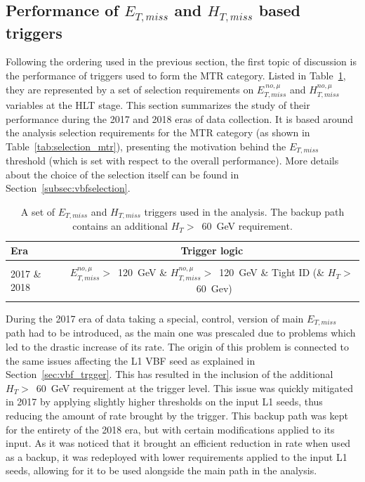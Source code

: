 \subsection{Performance of $E_{T,miss}$ and $H_{T,miss}$ based triggers}
\label{subsec:mtr_triggers}
\hspace{10pt} Following the ordering used in the previous section, the first topic of discussion is the performance of triggers used to form the MTR category. Listed in Table~\ref{tab:metmht}, they are represented by a set of selection requirements on $E_{T,miss}^{~no,\mu}$ and $H_{T,miss}^{no,\mu}$ variables at the HLT stage. This section summarizes the study of their performance during the 2017 and 2018 eras of data collection. It is based around the analysis selection requirements for the MTR category (as shown in Table~\ref{tab:selection_mtr}), presenting the motivation behind the $E_{T,miss}$ threshold (which is set with respect to the overall performance). More details about the choice of the selection itself can be found in Section~\ref{subsec:vbfselection}.

\begin{table}[htbp]
\centering
\small
\begin{tabular}{l|c}
\hline\hline
Era & Trigger logic                                               \\ \hline
\multirow{3}{*}{2017 \& 2018} &\\
                      &$E_{T,miss}^{no,\mu}>$~120~GeV \& $H_{T,miss}^{no,\mu}>$~120~GeV \& Tight ID (\& $H_T>$~60~Gev)\\
                        &\\\hline
\hline\hline
\end{tabular}
\caption{A set of $E_{T,miss}$ and $H_{T,miss}$  triggers used in the analysis. The backup path contains an additional $H_T>$~60~GeV requirement.  \label{tab:metmht}}
\end{table}
\hspace{10pt} During the 2017 era of data taking a special, control, version of main $E_{T,miss}$ path had to be introduced, as the main one was prescaled due to problems which led to the drastic increase of its rate. The origin of this problem is connected to the same issues affecting the L1 VBF seed as explained in Section~\ref{sec:vbf_trgger}. This has resulted in the inclusion of the additional $H_T>$~60~GeV requirement at the trigger level. This issue was quickly mitigated in 2017 by applying slightly higher thresholds on the input L1 seeds, thus reducing the amount of rate brought by the trigger. This backup path was kept for the entirety of the 2018 era, but with certain modifications applied to its input. As it was noticed that it brought an efficient reduction in rate when used as a backup, it was redeployed with lower requirements applied to the input L1 seeds, allowing for it to be used alongside the main path in the analysis.

